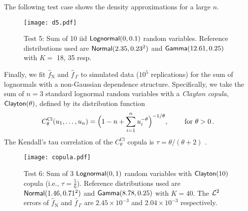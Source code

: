 The following test case shows the density approximations for a large $n$.


\begin{figure}[H]
\centering
\texttt{[image: d5.pdf]}
\caption*{Test 5: Sum of 10 iid $\mathsf{Lognormal}(0,0.1)$ random variables. Reference distributions used are $\mathsf{Normal}(2.35,0.23^2)$ and $\mathsf{Gamma}(12.61,0.25)$ with $K =$ 18, 35 resp.}
\end{figure}


Finally, we fit $\widehat{f}_{\mathrm{N}}$ and $\widehat{f}_{\,\Gamma}$ to simulated data ($10^5$ replications) for the sum of lognormals with a non-Gaussian dependence structure. Specifically, we take the sum of $n = 3$ standard lognormal random variables with a \emph{Clayton copula}, $\mathsf{Clayton}(\theta)$, defined by its distribution function
\[
C^{\text{Cl}}_\theta(u_1, \dots, u_n) = \Bigl( 1 - n + \sum_{i=1}^n u_i^{-\theta} \Bigr)^{-1/\theta}, \qquad \text{ for } \theta > 0 \,.
\]
The Kendall's tau correlation of the $C^{\text{Cl}}_\theta$ copula is $\tau = \theta / (\theta + 2)$ \cite{mcneil2015quantitative}.

\begin{figure}
\centering
\texttt{[image: copula.pdf]}
\caption*{Test 6: Sum of 3 $\mathsf{Lognormal}(0,1)$ random variables with $\mathsf{Clayton}(10)$ copula (i.e., $\tau = \frac56$). Reference distributions used are $\mathsf{Normal}(1.46,0.71^2)$ and $\mathsf{Gamma}(8.78,0.25)$ with $K = 40$. The $\mathcal{L}^2$ errors of $\widehat{f}_{\mathrm{N}}$ and $\widehat{f}_{\,\Gamma}$ are $2.45 \times 10^{-3}$ and $2.04 \times 10^{-3}$ respectively.}
\end{figure}




